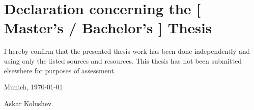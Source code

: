 \chapter*{Declaration concerning the [ Master’s / Bachelor’s ] Thesis}
I hereby confirm that the presented thesis work has been done independently and using only the listed sources and resources. This thesis has not been submitted elsewhere for purposes of assessment.

\vspace{1.5cm}

\noindent
Munich, \today

\vspace{3cm}

\noindent
\hrulefill

Askar Kolushev
